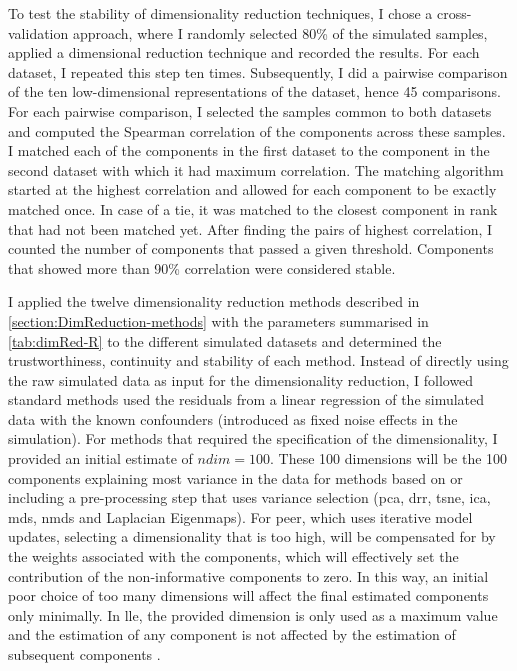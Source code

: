 To test the stability of dimensionality reduction techniques, I chose a cross-validation approach, where I randomly selected \num{80}\% of the simulated samples, applied a dimensional reduction technique and recorded the results. For each dataset, I repeated this step ten times. Subsequently, I did a pairwise comparison of the ten low-dimensional representations of the dataset, hence \num{45} comparisons. For each pairwise comparison, I selected the samples common to both datasets and computed the Spearman correlation of the components across these samples. I matched each of the components in the first dataset to the component in the second dataset with which it had maximum correlation. The matching algorithm started at the highest correlation and allowed for each component to be exactly matched once. In case of a tie, it was matched to the closest component in rank that had not been matched yet. After finding the pairs of highest correlation, I counted the number of components that passed a given threshold. Components that showed more than \num{90}\% correlation were considered stable. 

I applied the twelve dimensionality reduction methods described in \cref{section:DimReduction-methods} with the parameters summarised in \cref{tab:dimRed-R} to the different simulated datasets and determined the trustworthiness, continuity and stability of each method.  Instead of directly using the raw simulated data as input for the dimensionality reduction, I followed standard methods used the residuals from a linear regression of the simulated data with the known confounders (introduced as fixed noise effects in the simulation).  For methods that required the specification of the dimensionality, I provided an initial estimate of \(ndim=100\).  These \num{100} dimensions will be the \num{100} components explaining most variance in the data for methods based on or including a pre-processing step that uses variance selection (\gls{pca}, \gls{drr}, \gls{tsne}, \gls{ica}, \gls{mds}, \gls{nmds} and Laplacian Eigenmaps). For \gls{peer}, which uses iterative model updates, selecting a dimensionality that is too high, will be compensated for by the weights associated with the components, which will effectively set the contribution of the non-informative components to  zero. In this way, an initial poor choice of too many dimensions will affect the final estimated components only minimally. In \gls{lle}, the provided dimension is only used as a maximum value and the estimation of any component is not affected by the estimation of subsequent components \citep{Roweis2000,Kayo2006}.

